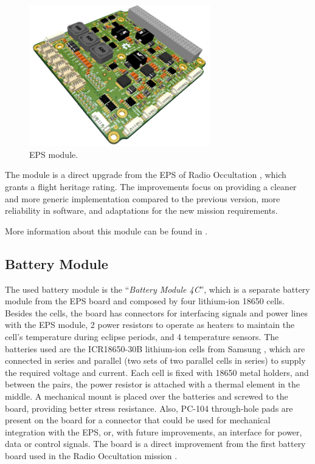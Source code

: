 \begin{figure}[!ht]
    \begin{center}
        \includegraphics[width=0.7\textwidth]{figures/eps2-pcb-3d}
        \caption{EPS module.}
        \label{fig:eps2}
    \end{center}
\end{figure}

The module is a direct upgrade from the EPS of Radio Occultation \cite{floripasat}, which grants a flight heritage rating. The improvements focus on providing a cleaner and more generic implementation compared to the previous version, more reliability in software, and adaptations for the new mission requirements.

More information about this module can be found in \cite{eps2}.

\subsection{Battery Module} \label{ssec:battery-module}

The used battery module is the ``\textit{Battery Module 4C}'', which is a separate battery module from the EPS board and composed by four lithium-ion 18650 cells. Besides the cells, the board has connectors for interfacing signals and power lines with the EPS module, 2 power resistors to operate as heaters to maintain the cell's temperature during eclipse periods, and 4 temperature sensors. The batteries used are the ICR18650-30B lithium-ion cells from Samsung \cite{icr18650-30b}, which are connected in series and parallel (two sets of two parallel cells in series) to supply the required voltage and current. Each cell is fixed with 18650 metal holders, and between the pairs, the power resistor is attached with a thermal element in the middle. A mechanical mount is placed over the batteries and screwed to the board, providing better stress resistance. Also, PC-104 through-hole pads are present on the board for a connector that could be used for mechanical integration with the EPS, or, with future improvements, an interface for power, data or control signals. The board is a direct improvement from the first battery board used in the Radio Occultation mission \cite{floripasat}.

